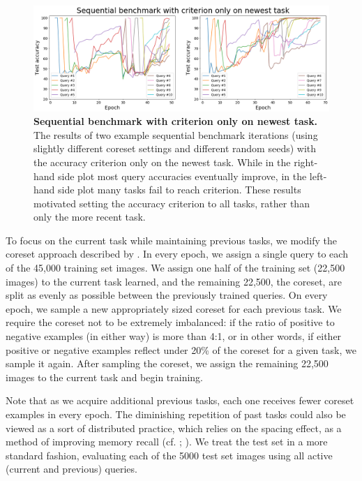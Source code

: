 \begin{figure}[!htb]
\centering
\includegraphics[width=\linewidth]{ch-dataset-task-benchmark/figures/benchmark/old_benchmark.png}
\caption[Sequential benchmark with criterion only on newest task.]{{\bf Sequential benchmark with criterion only on newest task.} The results of two example sequential benchmark iterations (using slightly different coreset settings and different random seeds) with the accuracy criterion only on the newest task. While in the right-hand side plot most query accuracies eventually improve, in the left-hand side plot many tasks fail to reach criterion. These results motivated setting the accuracy criterion to all tasks, rather than only the more recent task.}
\label{fig:old-sequential-benchmark}
\end{figure}

To focus on the current task while maintaining previous tasks, we modify the coreset approach described by \textcite{Nguyen2018}. In every epoch, we assign a single query to each of the 45,000 training set images. We assign one half of the training set (22,500 images) to the current task learned, and the remaining 22,500, the coreset, are split as evenly as possible between the previously trained queries. On every epoch, we sample a new appropriately sized coreset for each previous task. We require the coreset not to be extremely imbalanced: if the ratio of positive to negative examples (in either way) is more than 4:1, or in other words, if either positive or negative examples reflect under 20\% of the coreset for a given task, we sample it again. After sampling the coreset, we assign the remaining 22,500 images to the current task and begin training. 

Note that as we acquire additional previous tasks, each one receives fewer coreset examples in every epoch. The diminishing repetition of past tasks could also be viewed as a sort of distributed practice, which relies on the spacing effect, as a method of improving memory recall (cf. \cite{Bahrick1993}; \cite{Russo1998}). We treat the test set in a more standard fashion, evaluating each of the 5000 test set images using all active (current and previous) queries.

